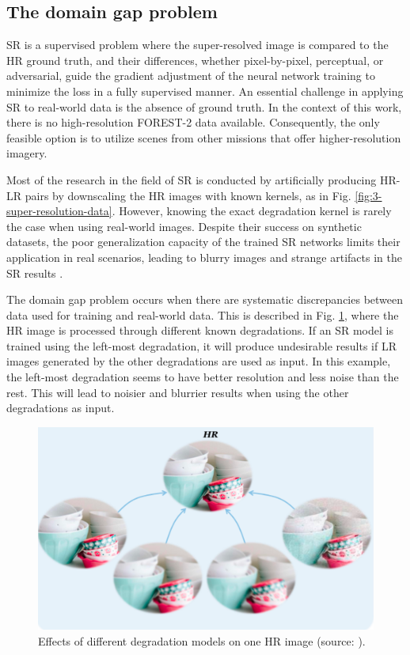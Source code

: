     \subsection{The domain gap problem} \label{subsec:domaingap}
 
        SR is a supervised problem where the super-resolved image is compared to the HR ground truth, and their differences, whether pixel-by-pixel, perceptual, or adversarial, guide the gradient adjustment of the neural network training to minimize the loss in a fully supervised manner. 
        An essential challenge in applying SR to real-world data is the absence of ground truth. In the context of this work, there is no high-resolution FOREST-2 data available. Consequently, the only feasible option is to utilize scenes from other missions that offer higher-resolution imagery.

        Most of the research in the field of SR is conducted by artificially producing HR-LR pairs by downscaling the HR images with known kernels, as in Fig. \ref{fig:3-super-resolution-data}.
        However, knowing the exact degradation kernel is rarely the case when using real-world images.
        Despite their success on synthetic datasets, the poor generalization capacity of the trained SR networks limits their application in real scenarios, leading to blurry images and strange artifacts in the SR results \cite{lugmayr2020ntire}.

        The domain gap problem occurs when there are systematic discrepancies between data used for training and real-world data. 
        This is described in Fig. \ref{fig:2-domain-gap}, where the HR image is processed through different known degradations. 
        If an SR model is trained using the left-most degradation, it will produce undesirable results if LR images generated by the other degradations are used as input.
        In this example, the left-most degradation seems to have better resolution and less noise than the rest. This will lead to noisier and blurrier results when using the other degradations as input.

        \begin{figure}[H]
            \centering
            \includegraphics[scale=0.4]{Includes/2-domain-gap.pdf}
            \caption{Effects of different degradation models on one HR image (source: \cite{liu2021blind}).}
            \label{fig:2-domain-gap}
        \end{figure}

